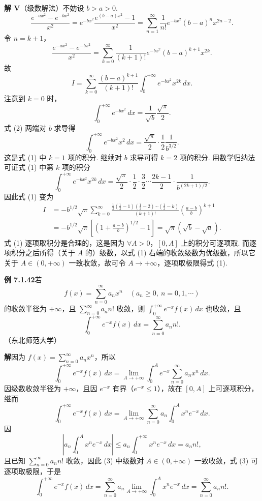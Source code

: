 \documentclass[UTF8, 12pt, fontset=fandol, oneside]{ctexart}
\begin{document}
\noindent\textbf{解 V}\quad （级数解法）不妨设 $b>a>0$.
\[
\frac{e^{-ax^2}-e^{-bx^2}}{x^2}
=e^{-bx^2}\frac{e^{(b-a)x^2}-1}{x^2}
=\sum_{n=1}^{\infty}\frac1{n!}e^{-bx^2}(b-a)^n x^{2n-2}.
\]
令 $n=k+1$，
\[
\frac{e^{-ax^2}-e^{-bx^2}}{x^2}
=\sum_{k=0}^{\infty}\frac1{(k+1)!}e^{-bx^2}(b-a)^{k+1}x^{2k}.
\]
故
\[
I=\sum_{k=0}^{\infty}\frac{(b-a)^{k+1}}{(k+1)!}\int_0^{+\infty}e^{-bx^2}x^{2k}\,dx.
\tag{1}
\]
注意到 $k=0$ 时，
\[
\int_0^{+\infty}e^{-bx^2}\,dx=\frac1{\sqrt b}\frac{\sqrt\pi}{2}.
\tag{2}
\]
式 (2) 两端对 $b$ 求导得
\[
\int_0^{+\infty}e^{-bx^2}x^2\,dx=\frac{\sqrt\pi}{2}\cdot\frac12\frac1{b^{3/2}}.
\]
这是式 (1) 中 $k=1$ 项的积分. 继续对 $b$ 求导可得 $k=2$ 项的积分. 用数学归纳法可证式 (1) 中第 $k$ 项的积分
\[
\int_0^{+\infty}e^{-bx^2}x^{2k}\,dx
=\frac{\sqrt\pi}{2}\cdot\frac12\cdot\frac32\cdots\frac{2k-1}{2}\cdot\frac1{b^{(2k+1)/2}}.
\]
因此式 (1) 变为
\[
\begin{aligned}
I
&=-b^{1/2}\sqrt\pi
\sum_{k=0}^{\infty}
\frac{\frac12(\frac12-1)(\frac12-2)\cdots(\frac12-k)}{(k+1)!}
\left(\frac{a-b}{b}\right)^{k+1}\\
&=-b^{1/2}\sqrt\pi\left[\left(1+\frac{a-b}{b}\right)^{1/2}-1\right]
=\sqrt\pi(\sqrt b-\sqrt a).
\end{aligned}
\]
式 (1) 逐项取积分是合理的，这是因为 $\forall A>0$，$[0,A]$ 上的积分可逐项取. 而逐项积分之后所得（关于 $A$ 的）级数，以式 (1) 右端的收敛级数为优级数，所以它关于 $A\in(0,+\infty)$ 一致收敛，故可令 $A\to+\infty$，逐项取极限得式 (1).

\noindent\textbf{例 7.1.42}\quad 若
\[
f(x)=\sum_{n=0}^{\infty}a_nx^n\quad(a_n\ge0,\ n=0,1,\cdots)
\]
的收敛半径为 $+\infty$，且 $\displaystyle\sum_{n=0}^{\infty}a_nn!$ 收敛，则 $\displaystyle\int_0^{+\infty}e^{-x}f(x)\,dx$ 也收敛，且
\[
\int_0^{+\infty}e^{-x}f(x)\,dx=\sum_{n=0}^{\infty}a_nn!.
\tag{1}
\]
（东北师范大学）

\noindent\textbf{解}\quad 因为 $f(x)=\displaystyle\sum_{n=0}^{\infty}a_nx^n$，所以
\[
\int_0^{+\infty}e^{-x}f(x)\,dx
=\lim_{A\to+\infty}\int_0^Ae^{-x}\sum_{n=0}^{\infty}a_nx^n\,dx.
\tag{2}
\]
因级数收敛半径为 $+\infty$，且因 $e^{-x}$ 有界（$e^{-x}\le1$），故在 $[0,A]$ 上可逐项积分，继而
\[
\int_0^{+\infty}e^{-x}f(x)\,dx
=\lim_{A\to+\infty}\sum_{n=0}^{\infty}a_n\int_0^Ax^ne^{-x}\,dx.
\tag{3}
\]
因
\[
\left|a_n\int_0^Ax^ne^{-x}\,dx\right|
\le a_n\int_0^{+\infty}x^ne^{-x}\,dx=a_nn!,
\]
且已知 $\displaystyle\sum_{n=0}^{\infty}a_nn!$ 收敛，因此 (3) 中级数对 $A\in(0,+\infty)$ 一致收敛，式 (3) 可逐项取极限，于是
\[
\int_0^{+\infty}e^{-x}f(x)\,dx
=\sum_{n=0}^{\infty}a_n\lim_{A\to+\infty}\int_0^Ax^ne^{-x}\,dx
=\sum_{n=0}^{\infty}a_nn!.
\]
\end{document}
